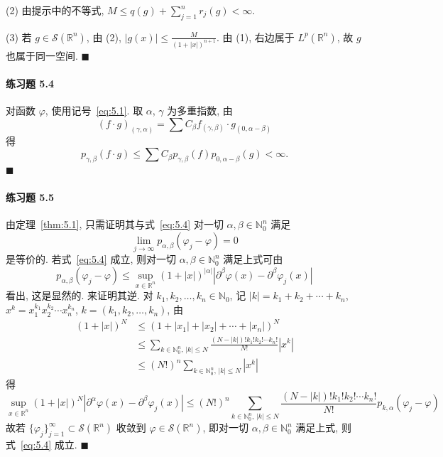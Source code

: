 (2) 由提示中的不等式, $M \leq q(g) + \sum_{j=1}^{n}r_{j}(g) < \infty$.

(3) 若 $g \in \mathcal{S}(\mathbb{R}^{n})$, 由 (2), $|g(x)| \leq \frac{M}{(1+|x|)^{n+1}}$. 由 (1), 右边属于 $L^{p}(\mathbb{R}^{n})$, 故 $g$ 也属于同一空间. $\blacksquare$

\paragraph*{练习题 5.4}
对函数 $\varphi$, 使用记号~\eqref{eq:5.1}. 取 $\alpha$, $\gamma$ 为多重指数, 由
\[
(f \cdot g)_{(\gamma, \alpha)} = \sum C_{\beta}f_{(\gamma, \beta)} \cdot g_{(0, \alpha-\beta)}
\]
得
\[
p_{\gamma,\beta}(f \cdot g) \leq \sum C_{\beta}p_{\gamma,\beta}(f)p_{0,\alpha-\beta}(g) < \infty.
\]
$\blacksquare$

\paragraph*{练习题 5.5}
由定理~\ref{thm:5.1}, 只需证明其与式~\eqref{eq:5.4} 对一切 $\alpha, \beta \in \mathbb{N}_{0}^{n}$ 满足
\[
\lim_{j \to \infty}p_{\alpha,\beta}(\varphi_{j}-\varphi) = 0
\]
是等价的. 若式~\eqref{eq:5.4} 成立, 则对一切 $\alpha, \beta \in \mathbb{N}_{0}^{n}$ 满足上式可由
\[
p_{\alpha,\beta}(\varphi_{j}-\varphi) \leq \sup_{x \in \mathbb{R}^{n}}(1+|x|)^{|\alpha|}|\partial^{\beta}\varphi(x) - \partial^{\beta}\varphi_{j}(x)|
\]
看出, 这是显然的. 来证明其逆. 对 $k_{1}, k_{2}, \ldots, k_{n} \in \mathbb{N}_{0}$, 记 $|k| = k_{1}+k_{2}+\cdots+k_{n}$, $x^{k} = x_{1}^{k_{1}}x_{2}^{k_{2}}\cdots x_{n}^{k_{n}}$, $k = (k_{1}, k_{2}, \ldots, k_{n})$, 由
\begin{align*}
(1+|x|)^{N} &\leq (1+|x_{1}|+|x_{2}|+\cdots+|x_{n}|)^{N} \\
&\leq \sum_{k \in \mathbb{N}_{0}^{n},\, |k| \leq N}\frac{(N-|k|)!k_{1}!k_{2}!\cdots k_{n}!}{N!}|x^{k}| \\
&\leq (N!)^{n}\sum_{k \in \mathbb{N}_{0}^{n},\, |k| \leq N}|x^{k}|
\end{align*}
得
\[
\sup_{x \in \mathbb{R}^{n}}(1+|x|)^{N}|\partial^{\alpha}\varphi(x) - \partial^{\beta}\varphi_{j}(x)| \leq (N!)^{n}\sum_{k \in \mathbb{N}_{0}^{n},\, |k| \leq N}\frac{(N-|k|)!k_{1}!k_{2}!\cdots k_{n}!}{N!}p_{k,\alpha}(\varphi_{j}-\varphi)
\]
故若 $\{\varphi_{j}\}_{j=1}^{\infty} \subset \mathcal{S}(\mathbb{R}^{n})$ 收敛到 $\varphi \in \mathcal{S}(\mathbb{R}^{n})$, 即对一切 $\alpha, \beta \in \mathbb{N}_{0}^{n}$ 满足上式, 则式~\eqref{eq:5.4} 成立. $\blacksquare$

